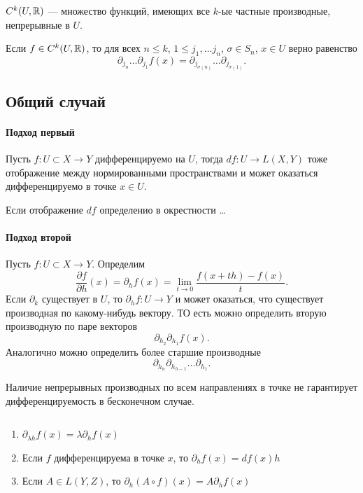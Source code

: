 \begin{defn}
    $ C^{k}(U, \mathbb{R})$ --- множество функций, имеющих все $ k$-ые частные производные, непрерывные в  $ U$.
\end{defn}
\begin{cor}
    Если $ f \in C^{k}(U , \mathbb{R})$, то для всех $ n \le k$, $ 1 \le  j_1, \ldots j_n$, $ \sigma \in S_n $, $ x \in U$ верно равенство
    \[
	\partial _{ j_n }\ldots \partial _{j_1}f(x) = \partial _{j_{ \sigma (n)}}\ldots \partial _{j _{   \sigma (1)}}
    .\] 
\end{cor}
\subsection{Общий случай}
\paragraph{Подход первый}
Пусть $ f\colon  U \subset X \to  Y$ дифференцируемо на $ U$, тогда  $ df \colon U \to  L(X, Y)$ тоже отображение между нормированными пространствами и может оказаться дифференцируемо в точке $ x \in U$. 
\begin{defn}
    Если отображение $ df$ определенио в окрестности \ldots 
\end{defn}
\paragraph{Подход второй}
\begin{defn}
    Пусть $ f\colon U \subset  X \to  Y$. Определим
    \[
	\frac{\partial f}{\partial h}(x) = \partial _h f(x) = \lim_{t \to  0} \frac{f(x+th) - f(x)}{t} 
    .\] 
    Если $ \partial _k$ существует в $ U$, то  $ \partial _h f \colon U \to  Y$ и может оказаться, что существует производная по какому-нибудь вектору. ТО есть можно определить вторую производную по паре векторов
    \[
	\partial _{h_2} \partial _{h_1}f(x)
    .\] 
    Аналогично можно определить более старшие производные
    \[
    \partial _{ h_n } \partial _{h_{h-1}} \ldots  \partial _{h_1}
    .\] 
\end{defn}
\begin{note}
    Наличие непрерывных производных по всем направлениях в точке не гарантирует дифференцируемость в бесконечном случае.
\end{note}
\begin{prop}
    $ $
    \begin{enumerate}[noitemsep]
	\item $ \partial _{\lambda h}f(x) = \lambda \partial_h f(x)$
	\item Если $ f$ дифференцируема в точке  $ x$, то  $ \partial _h f(x) = df(x) h$
	\item Если $ A \in L(Y, Z) $, то $ \partial _h (A \circ f) (x) = A\partial _h f(x)$
    \end{enumerate}
\end{prop}

